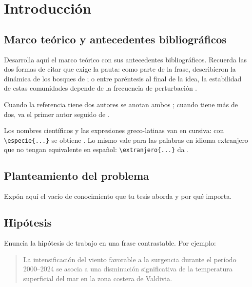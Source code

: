 %

\chapter{Introducción}

\section{Marco teórico y antecedentes bibliográficos}

Desarrolla aquí el marco teórico con sus antecedentes bibliográficos. Recuerda
las dos formas de citar que exige la pauta: como parte de la frase,
\textcite{Dayton1984} describieron la dinámica de los bosques de
; o entre paréntesis al final de la idea, la estabilidad
de estas comunidades depende de la frecuencia de perturbación
\parencite{Dayton1984}.

Cuando la referencia tiene dos autores se anotan ambos
\parencite{BeckerOrtiz1968}; cuando tiene más de dos, va el primer autor
seguido de  \parencite{Becker1968}.

Los nombres científicos y las expresiones greco-latinas van en cursiva: con
\verb|\especie{...}| se obtiene . Lo mismo vale
para las palabras en idioma extranjero que no tengan equivalente en español:
\verb|\extranjero{...}| da .

\section{Planteamiento del problema}

Expón aquí el vacío de conocimiento que tu tesis aborda y por qué importa.

\section{Hipótesis}

Enuncia la hipótesis de trabajo en una frase contrastable. Por ejemplo:

\begin{quote}
\singlespacing
La intensificación del viento favorable a la surgencia durante el período
2000--2024 se asocia a una disminución significativa de la temperatura
superficial del mar en la zona costera de Valdivia.
\end{quote}

